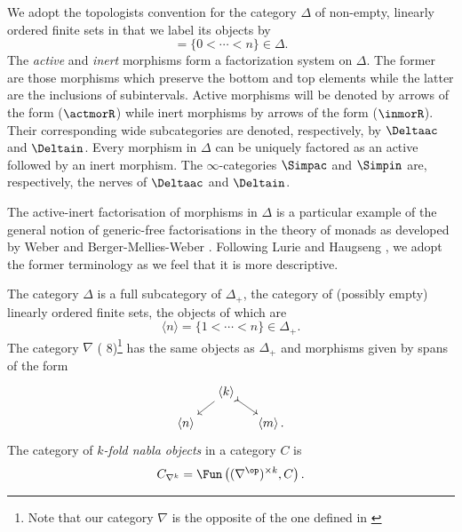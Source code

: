 \documentclass[a4paper]{article}
\numberwithin{equation}{section}
\begin{document}
 We adopt the topologists convention for the category $\Delta$ of non-empty, linearly ordered finite sets in that we label its objects by 
 \begin{equation*}
 [n] = \{0<\cdots<n\}\in \Delta.
 \end{equation*}
 The {\em active} and {\em inert} morphisms form a factorization system on $\Delta$. The former are those morphisms which preserve the bottom and top elements while the latter are the inclusions of subintervals. Active morphisms will be denoted by arrows of the form ($\actmorR$) while inert morphisms by arrows of the form ($\inmorR$). Their corresponding wide subcategories are denoted, respectively, by $\Deltaac$ and $\Deltain$. Every morphism in $\Delta$ can be uniquely factored as an active followed by an inert morphism. The $\infty$-categories $\Simpac$ and $\Simpin$ are, respectively, the nerves of $\Deltaac$ and $\Deltain$.
 
 \begin{remark}
  The active-inert factorisation of morphisms in $\Delta$ is a particular example of the general notion of generic-free factorisations in the theory of monads as developed by Weber \cite{Weber} and Berger-Mellies-Weber \cite{BergerEtAl}. Following Lurie \cite{LurieHA} and Haugseng \cite{RuneMorita}, we adopt the former terminology as we feel that it is more descriptive.
 \end{remark}
 
 The category $\Delta$ is a full subcategory of $\Delta_+$, the category of (possibly empty) linearly ordered finite sets, the objects of which are
 \begin{equation*}
  \langle n \rangle = \{1 < \cdots < n\} \in \Delta_+.
 \end{equation*}
 The category $\nabla$ (\cite{Kockres} 8)\footnote{Note that our category $\nabla$ is the opposite of the one defined in \cite{Kockres}} has the same objects as $\Delta_+$ and morphisms given by spans of the form 
 \begin{equation}
 \label{nabladefn}
 \xymatrixcolsep{1.1pc} \xymatrixrowsep{.8pc} \xymatrix{ & \ar[ld] \langle k \rangle \ar@{>->}[rd] & \\
 \langle n \rangle &  & \langle m \rangle\, .}
 \end{equation}
 The category of {\em $k$-fold nabla objects} in a category $C$ is
 \begin{equation*}
 C_{\nabla^k} = \Fun \left((\nabla^\op)^{\times k} , C \right).
 \end{equation*}
 
\end{document}
